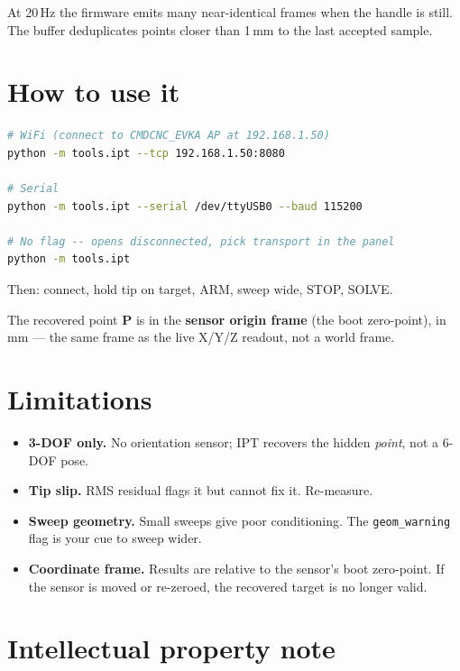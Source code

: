 \documentclass[11pt,a4paper]{article}
\begin{document}
At 20\,Hz the firmware emits many near-identical frames when the handle is still.
The buffer deduplicates points closer than 1\,mm to the last accepted sample.

\section{How to use it}

\begin{lstlisting}[language=bash]
# WiFi (connect to CMDCNC_EVKA AP at 192.168.1.50)
python -m tools.ipt --tcp 192.168.1.50:8080

# Serial
python -m tools.ipt --serial /dev/ttyUSB0 --baud 115200

# No flag -- opens disconnected, pick transport in the panel
python -m tools.ipt
\end{lstlisting}

Then: connect, hold tip on target, ARM, sweep wide, STOP, SOLVE.

The recovered point $\mathbf{P}$ is in the \textbf{sensor origin frame} (the boot
zero-point), in mm --- the same frame as the live X/Y/Z readout, not a world
frame.

\section{Limitations}

\begin{itemize}
\item \textbf{3-DOF only.} No orientation sensor; IPT recovers the hidden
  \emph{point}, not a 6-DOF pose.
\item \textbf{Tip slip.} RMS residual flags it but cannot fix it. Re-measure.
\item \textbf{Sweep geometry.} Small sweeps give poor conditioning. The
  \texttt{geom\_warning} flag is your cue to sweep wider.
\item \textbf{Coordinate frame.} Results are relative to the sensor's boot
  zero-point. If the sensor is moved or re-zeroed, the recovered target is no
  longer valid.
\end{itemize}

\section*{Intellectual property note}
\end{document}
